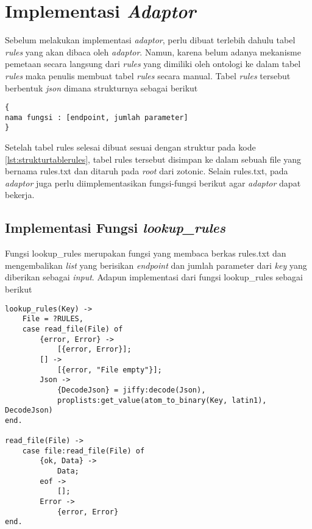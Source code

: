 \section{Implementasi \textit{Adaptor}}

Sebelum melakukan implementasi \textit{adaptor}, perlu dibuat terlebih dahulu tabel \textit{rules} yang akan dibaca oleh \textit{adaptor}. Namun, karena belum adanya mekanisme pemetaan secara langsung dari \textit{rules} yang dimiliki oleh ontologi ke dalam tabel \textit{rules} maka penulis membuat tabel \textit{rules} secara manual. Tabel \textit{rules} tersebut berbentuk \textit{json} dimana strukturnya sebagai berikut

\begin{minipage}{\linewidth}
\begin{lstlisting}[caption={Struktur tabel \textit{rules}},label={lst:strukturtablerules}]
{
nama fungsi : [endpoint, jumlah parameter]
}
\end{lstlisting}
\end{minipage}

Setelah tabel rules selesai dibuat sesuai dengan struktur pada kode \ref{lst:strukturtablerules}, tabel rules tersebut disimpan ke dalam sebuah file yang bernama rules.txt dan ditaruh pada \textit{root} dari zotonic. Selain rules.txt, pada \textit{adaptor} juga perlu diimplementasikan fungsi-fungsi berikut agar \textit{adaptor} dapat bekerja.

\subsection{Implementasi Fungsi \textit{lookup\_rules}}

Fungsi lookup\_rules merupakan fungsi yang membaca berkas rules.txt dan mengembalikan \textit{list} yang berisikan \textit{endpoint} dan jumlah parameter dari \textit{key} yang diberikan sebagai \textit{input}. Adapun implementasi dari fungsi lookup\_rules sebagai berikut

\begin{minipage}{\linewidth}
\begin{lstlisting}[caption={Implementasi fungsi lookup\_rules},label={lst:lookuprules}]
lookup_rules(Key) ->
	File = ?RULES,
	case read_file(File) of
		{error, Error} ->
			[{error, Error}];
		[] ->
			[{error, "File empty"}];
		Json ->
			{DecodeJson} = jiffy:decode(Json),
			proplists:get_value(atom_to_binary(Key, latin1), DecodeJson)
end.

read_file(File) ->
	case file:read_file(File) of
		{ok, Data} ->
			Data;
		eof ->
			[];
		Error ->
			{error, Error}
end.
\end{lstlisting}
\end{minipage}

